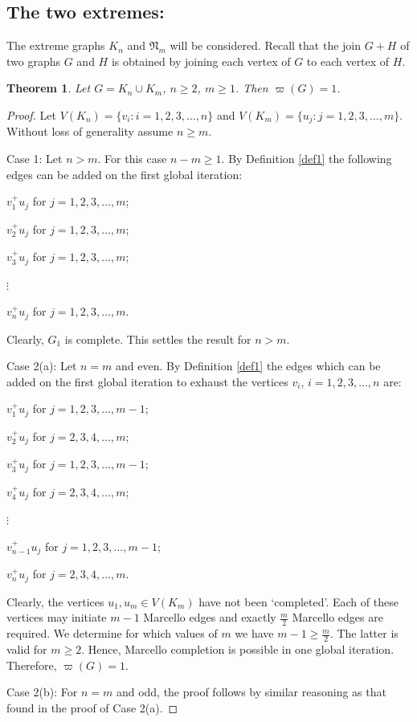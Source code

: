\documentclass[12pt]{amsart}
\numberwithin{equation}{section}
\newtheorem{theorem}{Theorem}[section]
\numberwithin{equation}{section}
\begin{document}
\subsection{The two extremes:} The extreme graphs $K_n$ and $\mathfrak{N}_m$ will be considered. Recall that the join $G+H$ of two graphs $G$ and $H$ is obtained by joining each vertex of $G$ to each vertex of $H$.
\begin{theorem}\label{thm2}
Let $G = K_n\cup K_m$, $n \geq 2$, $m \geq 1$. Then $\varpi(G) = 1$.
\end{theorem}
\begin{proof}
Let $V(K_n) = \{v_i: i = 1,2,3,\dots,n\}$ and $V(K_m) = \{u_j:j = 1,2,3,\dots,m\}$. Without loss of generality assume $n \geq m$.

Case 1: Let $n > m$. For this case $n-m \geq 1$. By Definition \ref{def1} the following edges can be added on the first global iteration:
\begin{center}
$v^+_1u_j$ for $j = 1,2,3,\dots,m$;

$v^+_2u_j$ for $j = 1,2,3,\dots,m$;

$v^+_3u_j$ for $j = 1,2,3,\dots,m$;

$\vdots$

$v^+_nu_j$ for $j = 1,2,3,\dots,m$.
\end{center}
Clearly, $G_1$ is complete. This settles the result for $n > m$.

Case 2(a): Let $n = m$ and even. By Definition \ref{def1} the edges which can be added on the first global iteration to exhaust the vertices $v_i$, $ i = 1,2,3,\dots,n$ are: 
\begin{center}
$v^+_1u_j$ for $j = 1,2,3,\dots,m-1$;

$v^+_2u_j$ for $j = 2,3,4,\dots,m$;

$v^+_3u_j$ for $j = 1,2,3,\dots,m-1$;

$v^+_4u_j$ for $j = 2,3,4,\dots,m$;

$\vdots$

$v^+_{n-1}u_j$ for $j = 1,2,3,\dots,m-1$;

$v^+_nu_j$ for $j = 2,3,4,\dots,m$.
\end{center}
Clearly, the vertices $u_1,u_m \in V(K_m)$ have not been \lq completed\rq. Each of these vertices may initiate $m-1$ Marcello edges and exactly $\frac{m}{2}$ Marcello edges are required. We determine for which values of $m$ we have $m-1 \geq \frac{m}{2}$. The latter is valid for $m \geq 2$. Hence, Marcello completion is possible in one global iteration. Therefore, $\varpi(G) = 1$.

Case 2(b): For $n = m$ and odd, the proof follows by similar reasoning as that found in the proof of Case 2(a).
\end{proof}
\end{document}
